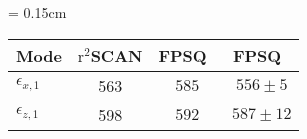 \documentclass[multi=tabular,varwidth=false]{standalone}
\begin{document}
\renewcommand{\arraystretch}{1.5}
{\tabcolsep = 0.15cm
  \begin{tabular}{lccc}
   \hline\hline
     Mode     & $\mathrm{r}^2$SCAN & FPSQ~\cite{gervais1974Temperature}    & FPSQ~\cite{schoche2013Infrared}\\
   \hline 
   $\epsilon_{x,1}$ & 563 & $585$ & $556\pm 5$ \\ 
   $\epsilon_{z,1}$ & 598 & $592$ & $587\pm 12$ \\ 
    \hline
   \hline
  \end{tabular}
}
\renewcommand{\arraystretch}{1.0}
\ifstandalone 

\fi
\end{document}
